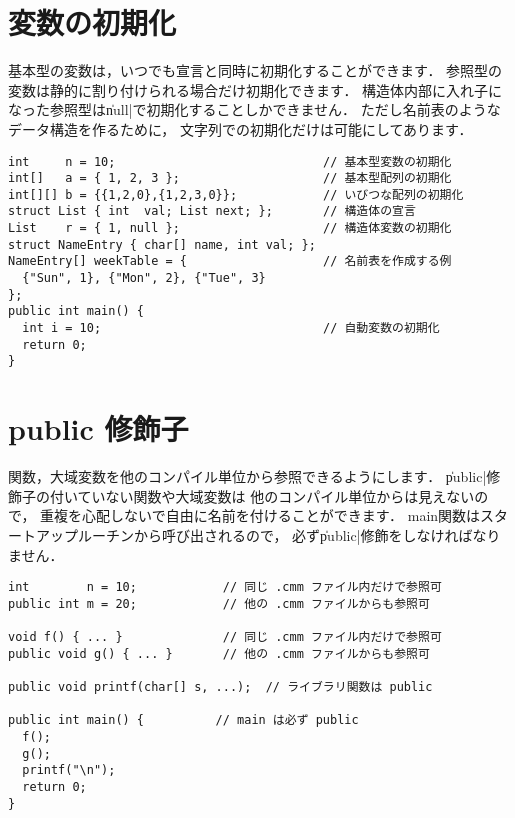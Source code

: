 \section{変数の初期化}

基本型の変数は，いつでも宣言と同時に初期化することができます．
参照型の変数は静的に割り付けられる場合だけ初期化できます．
構造体内部に入れ子になった参照型は\|null|で初期化することしかできません．
ただし名前表のようなデータ構造を作るために，
文字列での初期化だけは可能にしてあります．

\begin{mylist}
\begin{verbatim}
int     n = 10;                             // 基本型変数の初期化
int[]   a = { 1, 2, 3 };                    // 基本型配列の初期化
int[][] b = {{1,2,0},{1,2,3,0}};            // いびつな配列の初期化
struct List { int  val; List next; };       // 構造体の宣言
List    r = { 1, null };                    // 構造体変数の初期化
struct NameEntry { char[] name, int val; };
NameEntry[] weekTable = {                   // 名前表を作成する例
  {"Sun", 1}, {"Mon", 2}, {"Tue", 3}
};
public int main() {
  int i = 10;                               // 自動変数の初期化
  return 0;
}
\end{verbatim}
\end{mylist}

\section{public 修飾子}

関数，大域変数を他のコンパイル単位から参照できるようにします．
\|public|修飾子の付いていない関数や大域変数は
他のコンパイル単位からは見えないので，
重複を心配しないで自由に名前を付けることができます．
main関数はスタートアップルーチンから呼び出されるので，
必ず\|public|修飾をしなければなりません．

\begin{mylist}
\begin{verbatim}
int        n = 10;            // 同じ .cmm ファイル内だけで参照可
public int m = 20;            // 他の .cmm ファイルからも参照可

void f() { ... }              // 同じ .cmm ファイル内だけで参照可
public void g() { ... }       // 他の .cmm ファイルからも参照可

public void printf(char[] s, ...);  // ライブラリ関数は public

public int main() {          // main は必ず public
  f();
  g();
  printf("\n");
  return 0;
}
\end{verbatim}
\end{mylist}

